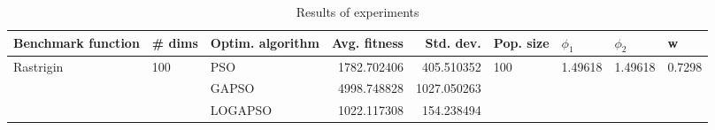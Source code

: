 \begin{table}
\centering
\caption{Results of experiments}
\begin{tabular}{lllrrllll}
\toprule
        Benchmark function &              \# dims & Optim. algorithm &  Avg. fitness &   Std. dev. &            Pop. size &               $\phi_{1}$ &               $\phi_{2}$ &                       w \\
\midrule
\multirow{3}{*}{Rastrigin} & \multirow{3}{*}{100} &              PSO &   1782.702406 &  405.510352 & \multirow{3}{*}{100} & \multirow{3}{*}{1.49618} & \multirow{3}{*}{1.49618} & \multirow{3}{*}{0.7298} \\
                           &                      &            GAPSO &   4998.748828 & 1027.050263 &                      &                          &                          &                         \\
                           &                      &          LOGAPSO &   1022.117308 &  154.238494 &                      &                          &                          &                         \\
\bottomrule
\end{tabular}
\end{table}
